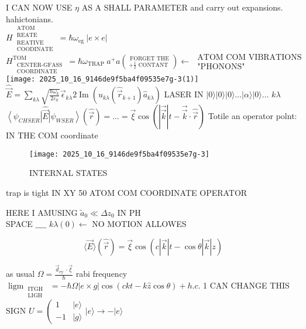 I CAN NOW USE $\eta$ AS A SHALL PARAMETER and carry out expansions. hahictonians.\\
$H_{\substack{\text { REATIVE } \\ \text { COODINATE }}}^{\substack{\text { ATOM } \\ \text { REATE }}}=\hbar \omega_{\text {eg }}|e \times e|$\\
$H_{\substack{\text { CENTER-GFASS } \\ \text { COORDINATE }}}^{\text {TOM }}=\hbar \omega_{\text {TRAP }} a^{+} a\binom{\text { FORGET THE }}{+\frac{1}{2} \text { CONTANT }} \leftarrow \begin{gathered}\text { ATOM COM VIBRATIONS } \\ \text { "PHONONS" }\end{gathered}$\\
\texttt{[image: 2025\_10\_16\_9146de9f5ba4f09535e7g-3(1)]}\\
$\hat{\vec{E}}=\sum_{k \lambda} \sqrt{\frac{\hbar \omega_{k}}{2 \varepsilon_{0}}} \vec{\epsilon}_{k \lambda} 2 \operatorname{Im}\left(u_{k \lambda}\left(\hat{\vec{r}}_{k+1}\right) \hat{a}_{k \lambda}\right)$ LASER IN $|0\rangle|0\rangle|0\rangle \ldots|\alpha\rangle|0\rangle \ldots$ $k \lambda$\\
$\left\langle\psi_{C HS E R}\right| \hat{\vec{E}}\left|\psi_{W S E R}\right\rangle(\hat{\vec{r}})=\ldots=\vec{\xi} \cos (|\overrightarrow{\vec{k}}| t-\overrightarrow{\vec{k}} \cdot \hat{\vec{r}})$ Totile an operator polnt: IN THE COM coordinate

\begin{figure}[h]
\begin{center}
  \texttt{[image: 2025\_10\_16\_9146de9f5ba4f09535e7g-3]}
\captionsetup{labelformat=empty}
\caption{INTERNAL STATES}
\end{center}
\end{figure}

trap is tight IN XY 50 ATOM COM COORDINATE OPERATOR

HERE I AMUSING $\tilde{a}_{0} \ll \Delta z_{0}$ IN PH\\
SPACE $\_\_\_\_$ $k \lambda (0) \longleftarrow$ NO MOTION ALLOWES

$$
\langle\vec{E}\rangle(\hat{\vec{r}})=\vec{\xi} \cos (c|\vec{k}| t-\cos \theta|\vec{k}| z)
$$

as usual $\Omega=\frac{\vec{d}_{\text {ey }} \cdot \vec{\xi}}{\hbar}$ rabi frequency $\operatorname{ligm}_{\substack{\text { ITGH } \\ \text { LIGH }}}=-\hbar \Omega|e \times g| \cos (c k t-k \hat{z} \cos \theta)+h . c$. 1 CAN CHANGE THIS SIGN $U=\left(\begin{array}{ll}1 & |e\rangle \\ -1 & |g\rangle\end{array}\right. |e\rangle \rightarrow-|e\rangle$

